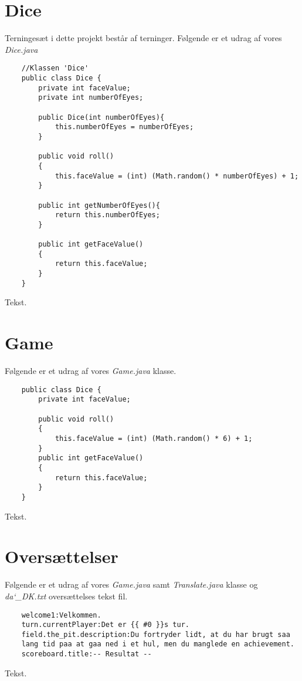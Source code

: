 \section{Dice}
\noindent Terningesæt i dette projekt består af terninger. 
Følgende er et udrag af vores \textit{Dice.java}\\
\begin{lstlisting}
    //Klassen 'Dice'    
    public class Dice {
        private int faceValue;
        private int numberOfEyes;

        public Dice(int numberOfEyes){
            this.numberOfEyes = numberOfEyes;
        }

        public void roll()
        {
            this.faceValue = (int) (Math.random() * numberOfEyes) + 1;
        }

        public int getNumberOfEyes(){
            return this.numberOfEyes;
        }

        public int getFaceValue()
        {
            return this.faceValue;
        }
    }
\end{lstlisting}
\vspace{2ex}

\noindent Tekst.\\

\section{Game}
\noindent Følgende er et udrag af vores \textit{Game.java} klasse.\\
\begin{lstlisting}
    public class Dice {
        private int faceValue;

        public void roll()
        {
            this.faceValue = (int) (Math.random() * 6) + 1;
        }
        public int getFaceValue()
        {
            return this.faceValue;
        }
    }
\end{lstlisting}
\vspace{2ex}

\noindent Tekst.\\

\section{Oversættelser}
\noindent Følgende er et udrag af vores \textit{Game.java} samt \textit{Translate.java} klasse og \textit{da\char`_DK.txt} oversættelses tekst fil.\\
\begin{lstlisting}
    welcome1:Velkommen.
    turn.currentPlayer:Det er {{ #0 }}s tur.
    field.the_pit.description:Du fortryder lidt, at du har brugt saa
    lang tid paa at gaa ned i et hul, men du manglede en achievement.    
    scoreboard.title:-- Resultat --    
\end{lstlisting}
\vspace{2ex}

\noindent Tekst.\\
